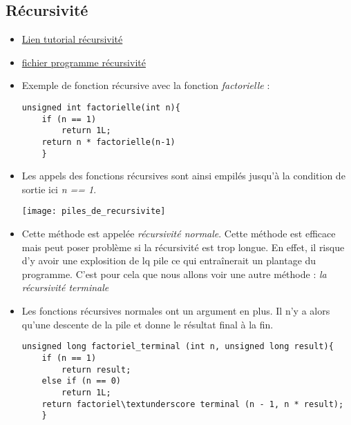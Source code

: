 \documentclass[12pt,a4paper]{article}
\begin{document}
\subsection{Récursivité}
\begin{itemize}
\item \href{https://franckh.developpez.com/tutoriels/c-ansi/recursivite/}{Lien tutorial récursivité}
\item \href{run:../Test C/}{fichier programme récursivité}
\item Exemple de fonction récursive avec la fonction \textit{factorielle} :
\begin{lstlisting}
unsigned int factorielle(int n){
	if (n == 1) 
		return 1L;
	return n * factorielle(n-1)
	}
\end{lstlisting}
\item Les appels des fonctions récursives sont ainsi empilés jusqu'à la condition de sortie ici \textit{n == 1}.
\begin{center}
\texttt{[image: piles\_de\_recursivite]}
\end{center}
\item Cette méthode est appelée \textit{récursivité normale}. Cette méthode est efficace mais peut poser problème si la récursivité est trop longue. En effet, il risque d'y avoir une explosition de lq pile ce qui entraînerait un plantage du programme. C'est pour cela que nous allons voir une autre méthode : \textit{la récursivité terminale}
\item Les fonctions récursives normales ont un argument en plus. Il n'y a alors qu'une descente de la pile et donne le résultat final à la fin.
\begin{lstlisting}
unsigned long factoriel_terminal (int n, unsigned long result){
	if (n == 1) 
		return result;
	else if (n == 0) 
		return 1L;
	return factoriel\textunderscore terminal (n - 1, n * result);
	}
\end{lstlisting}

\end{itemize}
\end{document}
